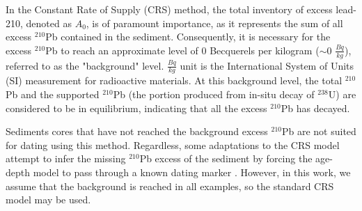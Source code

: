 \documentclass [10pt] {article}
\newcommand{\ac}{\color{red} }  %
\newcommand{\ca}{\color{black}} %
\begin{document}
In the Constant Rate of Supply (CRS) method, the total inventory of excess lead-210, denoted as $A_0$, is of paramount importance, as it represents the sum of all excess $^{210}$Pb contained in the sediment. Consequently, it is necessary for the excess $^{210}$Pb to reach an approximate level of 0 Becquerels per kilogram ($\sim$0 $\frac{Bq}{kg}$), referred to as the "background" level. $\frac{Bq}{kg}$ unit is the International System of Units (SI) measurement for radioactive materials. At this background level, the total $^{210}$Pb and the supported $^{210}$Pb (the portion produced from in-situ decay of $^{238}$U) are considered to be in equilibrium, indicating that all the excess $^{210}$Pb has decayed.


Sediments cores that have not reached the background excess $^{210}$Pb are not suited for dating using this method. Regardless, some adaptations to the CRS model attempt to infer the missing $^{210}$Pb excess of the sediment by forcing the age-depth model to pass through a known dating marker \citep[a depth where its age is known from other methods or with a constant sedimentation rate][]{Sanchez-Cabeza2012}. However, in this work, we assume that the background is reached in all examples, so the standard CRS model may be used.


\end{document}
